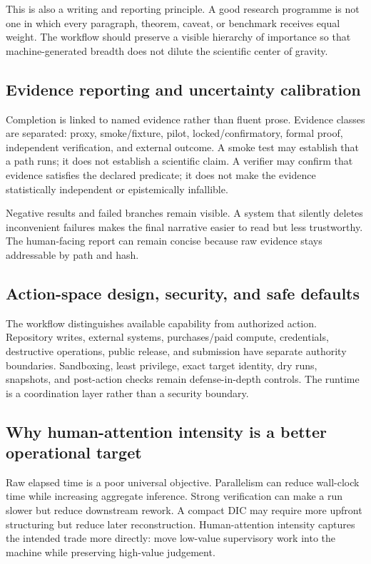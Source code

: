 \documentclass[11pt,a4paper]{article}
\begin{document}
This is also a writing and reporting principle. A good research programme is not one in which every paragraph, theorem, caveat, or benchmark receives equal weight. The workflow should preserve a visible hierarchy of importance so that machine-generated breadth does not dilute the scientific center of gravity.

\subsection{Evidence reporting and uncertainty calibration}\label{sec:evidence-reporting}
Completion is linked to named evidence rather than fluent prose. Evidence classes are separated: proxy, smoke/fixture, pilot, locked/confirmatory, formal proof, independent verification, and external outcome. A smoke test may establish that a path runs; it does not establish a scientific claim. A verifier may confirm that evidence satisfies the declared predicate; it does not make the evidence statistically independent or epistemically infallible.

Negative results and failed branches remain visible. A system that silently deletes inconvenient failures makes the final narrative easier to read but less trustworthy. The human-facing report can remain concise because raw evidence stays addressable by path and hash.

\subsection{Action-space design, security, and safe defaults}\label{sec:action-space}\label{sec:sandbox}
The workflow distinguishes available capability from authorized action. Repository writes, external systems, purchases/paid compute, credentials, destructive operations, public release, and submission have separate authority boundaries. Sandboxing, least privilege, exact target identity, dry runs, snapshots, and post-action checks remain defense-in-depth controls. The runtime is a coordination layer rather than a security boundary.

\subsection{Why human-attention intensity is a better operational target}
Raw elapsed time is a poor universal objective. Parallelism can reduce wall-clock time while increasing aggregate inference. Strong verification can make a run slower but reduce downstream rework. A compact DIC may require more upfront structuring but reduce later reconstruction. Human-attention intensity captures the intended trade more directly: move low-value supervisory work into the machine while preserving high-value judgement.
\end{document}
